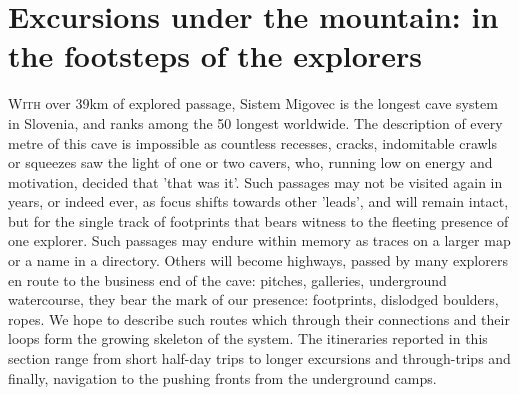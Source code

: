 \vspace{60pt}
\part{Excursions under the mountain: in the footsteps of the explorers}
	\lettrine{W}{ith} over 39km of explored passage, Sistem Migovec is the longest cave system in Slovenia, and ranks among the 50 longest worldwide. The description of every metre of this cave is impossible as countless recesses, cracks, indomitable crawls or squeezes saw the light of one or two cavers, who, running low on energy and motivation, decided that 'that was it'. Such passages may not be visited again in years, or indeed ever, as focus shifts towards other 'leads', and will remain intact, but for the single track of footprints that bears witness to the fleeting presence of one explorer. Such passages may endure within memory as traces on a larger map or a name in a directory. Others will become highways, passed by many explorers en route to the business end of the cave: pitches, galleries, underground watercourse, they bear the mark of our presence: footprints, dislodged boulders, ropes. We hope to describe such routes which through their connections and their loops form the growing skeleton of the system. The itineraries reported in this section range from short half-day trips  to longer excursions and through-trips and finally, navigation to the pushing fronts from the underground camps.

